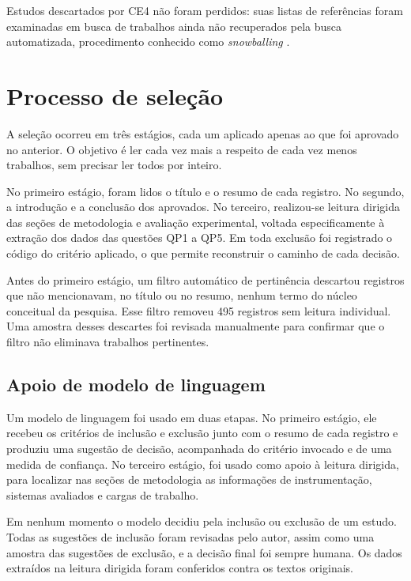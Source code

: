 Estudos descartados por CE4 não foram perdidos: suas listas de referências foram
examinadas em busca de trabalhos ainda não recuperados pela busca automatizada,
procedimento conhecido como \textit{snowballing} \citep{wohlin2014}.

\section{Processo de seleção}
\label{sec:selecao}

A seleção ocorreu em três estágios, cada um aplicado apenas ao que foi aprovado
no anterior. O objetivo é ler cada vez mais a respeito de cada vez menos
trabalhos, sem precisar ler todos por inteiro.

No primeiro estágio, foram lidos o título e o resumo de cada registro. No
segundo, a introdução e a conclusão dos aprovados. No terceiro, realizou-se
leitura dirigida das seções de metodologia e avaliação experimental, voltada
especificamente à extração dos dados das questões QP1 a QP5. Em toda exclusão
foi registrado o código do critério aplicado, o que permite reconstruir o
caminho de cada decisão.

Antes do primeiro estágio, um filtro automático de pertinência descartou
registros que não mencionavam, no título ou no resumo, nenhum termo do núcleo
conceitual da pesquisa. Esse filtro removeu 495 registros sem leitura
individual. Uma amostra desses descartes foi revisada manualmente para
confirmar que o filtro não eliminava trabalhos pertinentes.

\subsection{Apoio de modelo de linguagem}
\label{sec:llm}

Um modelo de linguagem foi usado em duas etapas. No primeiro estágio, ele
recebeu os critérios de inclusão e exclusão junto com o resumo de cada registro
e produziu uma sugestão de decisão, acompanhada do critério invocado e de uma
medida de confiança. No terceiro estágio, foi usado como apoio à leitura
dirigida, para localizar nas seções de metodologia as informações de
instrumentação, sistemas avaliados e cargas de trabalho.

Em nenhum momento o modelo decidiu pela inclusão ou exclusão de um estudo. Todas
as sugestões de inclusão foram revisadas pelo autor, assim como uma amostra das
sugestões de exclusão, e a decisão final foi sempre humana. Os dados extraídos
na leitura dirigida foram conferidos contra os textos originais.

